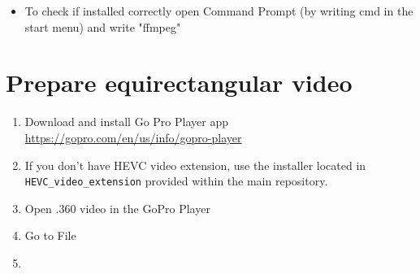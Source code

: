 \documentclass[a4paper,12pt]{book}
\begin{document}
\begin{enumerate}
\begin{itemize}
\begin{minipage}[t]{\linewidth}
{			}		
			\medskip	
		\end{minipage}
		Click New and paste path to \verb|\ffmpeg\bin| which contains ffmpeg.exe. Then confirm changes by pressing ok. After adding ffmpeg to PATH restart your computer.
		\item To check if installed correctly open Command Prompt (by writing cmd in the start menu) and write "ffmpeg"
	\end{itemize}
\end{enumerate}

\chapter{Prepare equirectangular video}
\begin{enumerate}
	\item Download and install Go Pro Player app \url{https://gopro.com/en/us/info/gopro-player}
	\item If you don't have HEVC video extension, use the installer located in \verb|HEVC_video_extension| provided within the main repository.
	\item Open .360 video in the GoPro Player
	 \item \begin{minipage}[t]{\linewidth}
	 	\raggedright
	 	\medskip	
	 \end{minipage}
	 Go to File
	 \item \begin{minipage}[t]{\linewidth}
	 	\raggedright
\end{minipage}
\end{enumerate}
\end{document}
